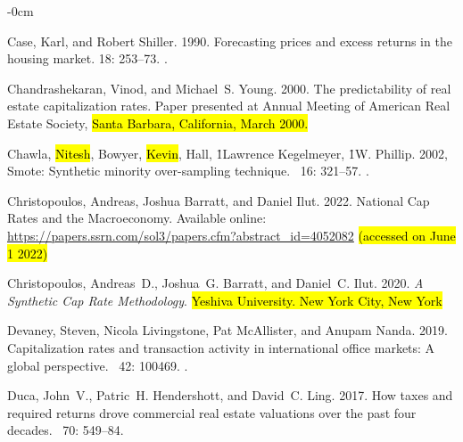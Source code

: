\documentclass[jrfm,article,accept,oneauthor,pdftex]{Definitions/mdpi}
\begin{document}
\begin{adjustwidth}{-\extralength}{0cm}
\begin{thebibliography}{999}
Case, Karl, and Robert Shiller. 1990.
\newblock Forecasting prices and excess returns in the housing market.
 18:  253--73.
.

Chandrashekaran, Vinod, and Michael~S. Young. 2000.
\newblock The predictability of real estate capitalization rates.
Paper presented at {Annual Meeting of American Real Estate Society, \hl{Santa Barbara, California, March 2000.} %
}

Chawla, \hl{Nitesh}, %
Bowyer, \hl{Kevin}, 
Hall, \h1{Lawrence}
Kegelmeyer, \h1{W. Phillip}. 2002, 
\newblock Smote: Synthetic minority over-sampling technique.
~{16}:
  321--57.
.

Christopoulos, Andreas, Joshua Barratt, and Daniel Ilut. 2022.
\newblock National Cap Rates and the Macroeconomy. Available online: \url{https://papers.ssrn.com/sol3/papers.cfm?abstract_id=4052082} \hl{(accessed on June 1 2022)} %



Christopoulos, Andreas~D., Joshua~G. Barratt, and Daniel~C. Ilut. 2020.
\newblock \emph{A Synthetic Cap Rate Methodology}.  \hl{Yeshiva University. New York City, New York} %


Devaney, Steven, Nicola Livingstone, Pat McAllister, and Anupam Nanda. 2019.
\newblock Capitalization rates and transaction activity in international office
  markets: A global perspective.
~{42}: 100469.
.

Duca, John~V., Patric~H. Hendershott, and David~C. Ling. 2017.
\newblock How taxes and required returns drove commercial real estate
  valuations over the past four decades.
~{70\/}:  549--84.


\end{thebibliography}
\end{adjustwidth}
\end{document}
